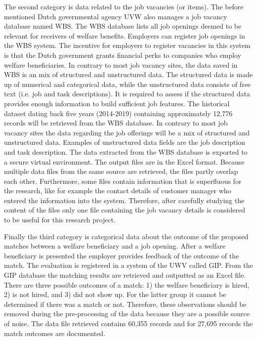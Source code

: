 The second category is data related to the job vacancies (or items). The before mentioned Dutch governmental agency UVW also manages a job vacancy database named WBS. The WBS database lists all job openings deemed to be relevant for receivers of welfare benefits. Employers can register job openings in the WBS system. The incentive for employers to register vacancies in this system is that the Dutch government grants financial perks to companies who employ welfare beneficiaries.
In contrary to most job vacancy sites, the data saved in WBS is an mix of structured and unstructured data. The structured data is made up of numerical and categorical data, while the unstructured data consists of free text (i.e. job and task descriptions). It is  required  to assess if the structured data provides enough information to build sufficient job features. The historical dataset dating back five years (2014-2019) containing approximately 12,776 records  will be retrieved from the WBS database. In contrary to most job vacancy sites the data regarding the job offerings will be a mix of structured and unstructured data. Examples of unstructured data fields are the job description and task description. The data extracted from the WBS database is exported to a secure virtual environment. The output files are in the Excel format.
Because multiple data files from the same source are retrieved, the files partly overlap each other. Furthermore, some files contain information that is superfluous for the research, like for example the contact details of customer manager who entered the information into the system. Therefore, after carefully studying the content of the files only one file containing the job vacancy details is considered to be useful for this research project.

Finally the third category is categorical data about the outcome of the proposed matches between a welfare beneficiary and a job opening. After a welfare beneficiary is presented the employer provides feedback of the outcome of the match. The evaluation is registered in a system of the UWV called GIP. From the GIP database the matching results are retrieved and outputted as an Excel file.
There are three possible outcomes of a match: 1) the welfare beneficiary is hired, 2) is not hired, and 3) did not show up. For the latter group it cannot be determined if there was a match or not. Therefore, these observations should be removed during the pre-processing of the data because they are a possible source of noise. The data file retrieved contains 60,355 records and for 27,695 records the match outcomes are documented. 







